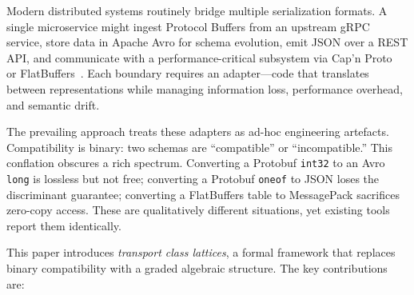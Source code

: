 \documentclass[11pt,a4paper]{article}
\theoremstyle{definition}
\theoremstyle{remark}
\begin{document}
Modern distributed systems routinely bridge multiple serialization
formats. A single microservice might ingest Protocol Buffers from an
upstream gRPC service, store data in Apache Avro for schema evolution,
emit JSON over a REST API, and communicate with a performance-critical
subsystem via Cap'n Proto~\cite{capnproto} or
FlatBuffers~\cite{flatbuffers}. Each boundary requires an adapter---code
that translates between representations while managing information loss,
performance overhead, and semantic drift.

The prevailing approach treats these adapters as ad-hoc engineering
artefacts. Compatibility is binary: two schemas are ``compatible'' or
``incompatible.'' This conflation obscures a rich spectrum.
Converting a Protobuf \texttt{int32} to an Avro \texttt{long} is lossless
but not free; converting a Protobuf \texttt{oneof} to JSON loses the
discriminant guarantee; converting a FlatBuffers table to MessagePack
sacrifices zero-copy access. These are qualitatively different
situations, yet existing tools report them identically.

This paper introduces \emph{transport class lattices}, a formal
framework that replaces binary compatibility with a graded algebraic
structure. The key contributions are:
\end{document}
